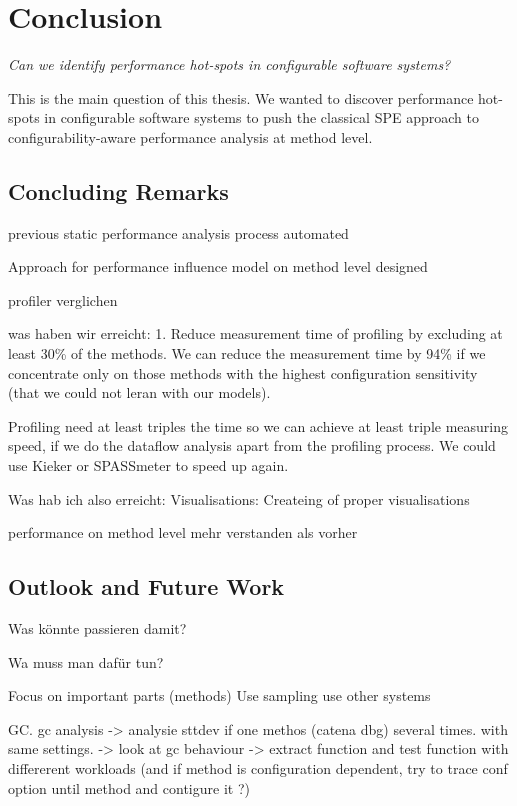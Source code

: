 \chapter{Conclusion}
\label{chap:conlusion}

\centerline{\emph{Can we identify performance hot-spots in configurable software systems?}}

This is the main question of this thesis. We wanted to discover performance hot-spots in configurable software systems to push the classical \ac{SPE} approach to configurability-aware performance analysis at method level.

\section{Concluding Remarks}

previous static performance analysis process automated

Approach for performance influence model on method level designed

profiler verglichen


was haben wir erreicht:
1. Reduce measurement time of profiling by excluding at least 30\% of the methods. We can reduce the measurement time by 94\% if we concentrate only on those methods with the highest configuration sensitivity (that we could not leran with our models). 

Profiling need at least triples the time so we can achieve at least triple measuring speed, if we do the dataflow analysis apart from the profiling process. We could use Kieker or SPASSmeter to speed up again.

Was hab ich also erreicht:
Visualisations:
Createing of proper visualisations


performance on method level mehr verstanden als vorher

\section{Outlook and Future Work}

Was könnte passieren damit?



Wa muss man dafür tun?

Focus on important parts (methods)
Use sampling
use other systems



GC.
gc analysis -> analysie sttdev if one methos (catena dbg) several times. with same settings. -> look at gc behaviour -> extract function and test function with differerent workloads (and if method is configuration dependent, try to trace conf option until method and contigure it ?)

